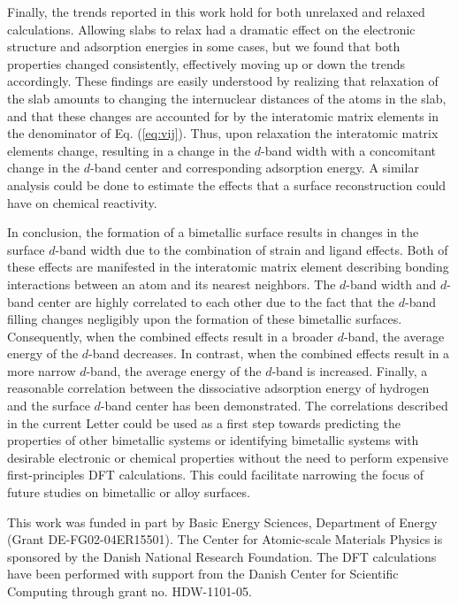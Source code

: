 \documentclass[aps,prl,twocolumn,superscriptaddress,showkeys]{revtex4}
\begin{document}
Finally, the trends reported in this work hold for both
unrelaxed and relaxed calculations. Allowing slabs to relax had a
dramatic effect on the electronic structure and adsorption energies in
some cases, but we found that both properties changed consistently,
effectively moving up or down the trends accordingly. These findings
are easily understood by realizing that relaxation of the slab amounts
to changing the internuclear distances of the atoms in the slab, and
that these changes are accounted for by the interatomic matrix
elements in the denominator of Eq. (\ref{eq:vij}). Thus, upon
relaxation the interatomic matrix elements change, resulting in a
change in the $d$-band width with a concomitant change in the $d$-band
center and corresponding adsorption energy. A similar analysis could be
done to estimate the effects that a surface reconstruction could have on
chemical reactivity.

In conclusion, the formation of a bimetallic surface results in
changes in the surface $d$-band width due to the combination of strain
and ligand effects.  Both of these effects are manifested in the
interatomic matrix element describing bonding interactions between an
atom and its nearest neighbors. The $d$-band width and $d$-band center are
highly correlated to each other due to the fact that the $d$-band
filling changes negligibly upon the formation of these bimetallic
surfaces.  Consequently, when the combined effects result in a broader
$d$-band, the average energy of the $d$-band decreases. In contrast, when
the combined effects result in a more narrow $d$-band, the average
energy of the $d$-band is increased. Finally, a reasonable correlation
between the dissociative adsorption energy of hydrogen and the surface
$d$-band center has been demonstrated.  The correlations described in the
current Letter could be used as a first step towards predicting the
properties of other bimetallic systems or identifying bimetallic
systems with desirable electronic or chemical properties without the
need to perform expensive first-principles DFT calculations.  This
could facilitate narrowing the focus of future studies on bimetallic
or alloy surfaces.



\begin{acknowledgments}
  This work was funded in part by Basic Energy Sciences, Department of
  Energy (Grant DE-FG02-04ER15501).  The Center for Atomic-scale
  Materials Physics is sponsored by the Danish National Research
  Foundation. The DFT calculations have been performed with support
  from the Danish Center for Scientific Computing through grant no.
  HDW-1101-05.
\end{acknowledgments}


\end{document}
